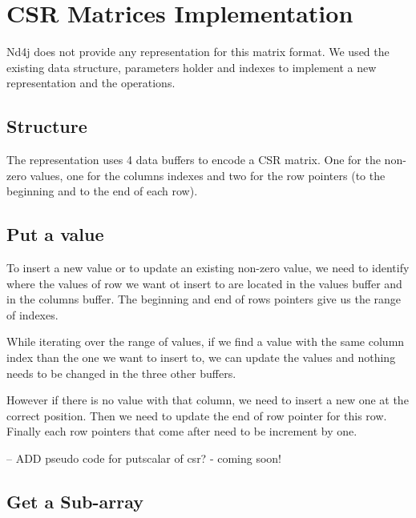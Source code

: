 \section{CSR Matrices Implementation}

Nd4j does not provide any representation for this matrix format. We used the existing data structure, parameters holder and indexes to implement a new representation and the operations.

\subsection{Structure}

The representation uses 4 data buffers to encode a CSR matrix. One for the non-zero values, one for the columns indexes and two for the row pointers (to the beginning and to the end of each row).

\subsection{Put a value}

To insert a new value or to update an existing non-zero value, we need to identify where the values of row we want ot insert to are located in the values buffer and in the columns buffer. The beginning and end of rows pointers give us the range of indexes.

While iterating over the range of values, if we find a value with the same column index than the one we want to insert to, we can update the values and nothing needs to be changed in the three other buffers. 

However if there is no value with that column, we need to insert a new one at the correct position. Then we need to update the end of row pointer for this row. Finally each row pointers that come after need to be increment by one.

-- ADD pseudo code for putscalar of csr? - coming soon!



\subsection{Get a Sub-array}

